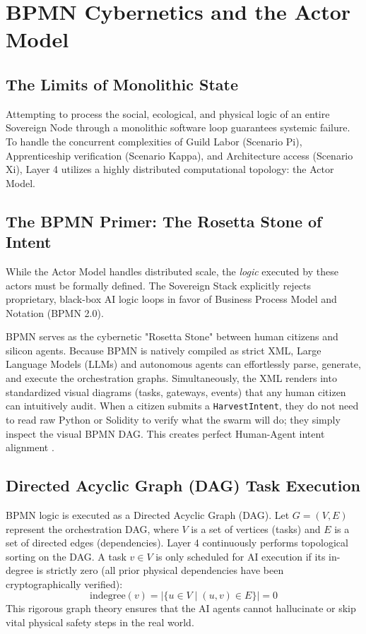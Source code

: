 \chapter{BPMN Cybernetics and the Actor Model}

\section{The Limits of Monolithic State}
Attempting to process the social, ecological, and physical logic of an entire Sovereign Node through a monolithic software loop guarantees systemic failure. To handle the concurrent complexities of Guild Labor (Scenario Pi), Apprenticeship verification (Scenario Kappa), and Architecture access (Scenario Xi), Layer 4 utilizes a highly distributed computational topology: the Actor Model.

\section{The BPMN Primer: The Rosetta Stone of Intent}
While the Actor Model handles distributed scale, the \textit{logic} executed by these actors must be formally defined. The Sovereign Stack explicitly rejects proprietary, black-box AI logic loops in favor of Business Process Model and Notation (BPMN 2.0).

BPMN serves as the cybernetic "Rosetta Stone" between human citizens and silicon agents. Because BPMN is natively compiled as strict XML, Large Language Models (LLMs) and autonomous agents can effortlessly parse, generate, and execute the orchestration graphs. Simultaneously, the XML renders into standardized visual diagrams (tasks, gateways, events) that any human citizen can intuitively audit. When a citizen submits a \texttt{HarvestIntent}, they do not need to read raw Python or Solidity to verify what the swarm will do; they simply inspect the visual BPMN DAG. This creates perfect Human-Agent intent alignment \cite{chinosi2012bpmn}.

\section{Directed Acyclic Graph (DAG) Task Execution}
BPMN logic is executed as a Directed Acyclic Graph (DAG). Let $G = (V, E)$ represent the orchestration DAG, where $V$ is a set of vertices (tasks) and $E$ is a set of directed edges (dependencies). Layer 4 continuously performs topological sorting on the DAG. A task $v \in V$ is only scheduled for AI execution if its in-degree is strictly zero (all prior physical dependencies have been cryptographically verified):
\begin{equation}
\text{indegree}(v) = | \{ u \in V \mid (u, v) \in E \} | = 0
\end{equation}
This rigorous graph theory ensures that the AI agents cannot hallucinate or skip vital physical safety steps in the real world.

